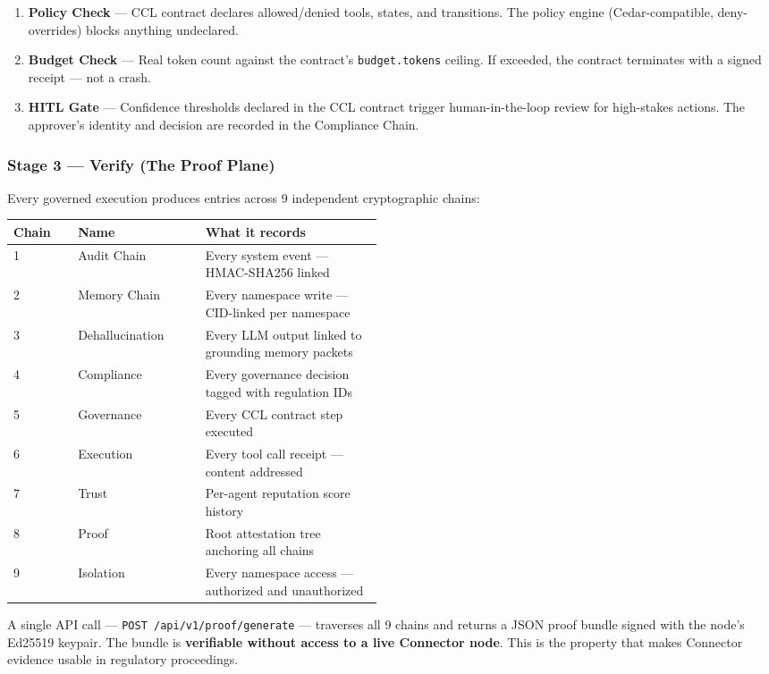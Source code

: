 \documentclass[11pt,a4paper]{article}
\begin{document}
\begin{enumerate}
  \item \textbf{Policy Check} — CCL contract declares allowed/denied tools, states, and transitions.
        The policy engine (Cedar-compatible, deny-overrides) blocks anything undeclared.
  \item \textbf{Budget Check} — Real token count against the contract's \texttt{budget.tokens} ceiling.
        If exceeded, the contract terminates with a signed receipt — not a crash.
  \item \textbf{HITL Gate} — Confidence thresholds declared in the CCL contract trigger human-in-the-loop
        review for high-stakes actions. The approver's identity and decision are recorded in the Compliance Chain.
\end{enumerate}

\subsubsection{Stage 3 — Verify (The Proof Plane)}
Every governed execution produces entries across 9 independent cryptographic chains:

\begin{center}
\small
\begin{tabular}{@{}llp{0.48\linewidth}@{}}
\toprule
\textbf{Chain} & \textbf{Name} & \textbf{What it records} \\
\midrule
1 & Audit Chain & Every system event — HMAC-SHA256 linked \\
2 & Memory Chain & Every namespace write — CID-linked per namespace \\
3 & Dehallucination & Every LLM output linked to grounding memory packets \\
4 & Compliance & Every governance decision tagged with regulation IDs \\
5 & Governance & Every CCL contract step executed \\
6 & Execution & Every tool call receipt — content addressed \\
7 & Trust & Per-agent reputation score history \\
8 & Proof & Root attestation tree anchoring all chains \\
9 & Isolation & Every namespace access — authorized and unauthorized \\
\bottomrule
\end{tabular}
\end{center}

A single API call — \texttt{POST /api/v1/proof/generate} — traverses all 9 chains and returns
a JSON proof bundle signed with the node's Ed25519 keypair. The bundle is
\textbf{verifiable without access to a live Connector node}. This is the property that makes
Connector evidence usable in regulatory proceedings.
\end{document}
